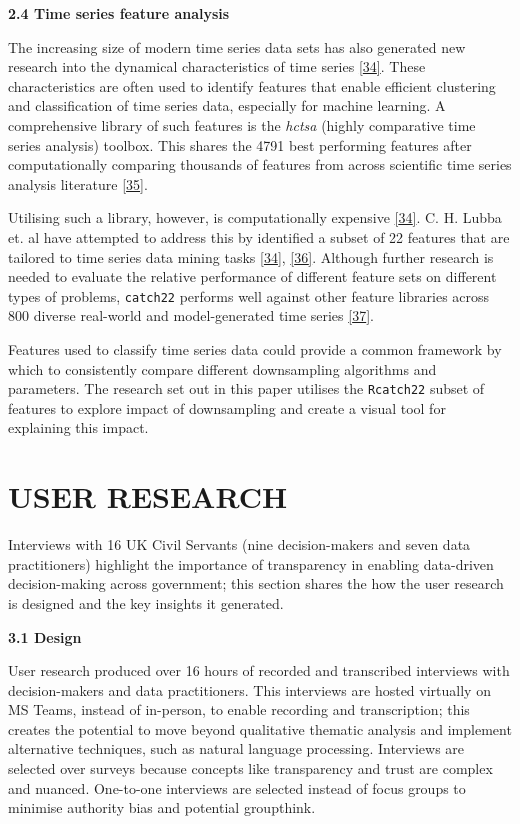\documentclass{article}
\begin{document}
\newpage

\textbf{2.4 Time series feature analysis}

The increasing size of modern time series data sets has also generated
new research into the dynamical characteristics of time series
\protect\hyperlink{ref-catch22}{{[}34{]}}. These characteristics are
often used to identify features that enable efficient clustering and
classification of time series data, especially for machine learning. A
comprehensive library of such features is the \emph{hctsa} (highly
comparative time series analysis) toolbox. This shares the 4791 best
performing features after computationally comparing thousands of
features from across scientific time series analysis literature
\protect\hyperlink{ref-fulcher2017}{{[}35{]}}.

Utilising such a library, however, is computationally expensive
\protect\hyperlink{ref-catch22}{{[}34{]}}. C. H. Lubba et. al have
attempted to address this by identified a subset of 22 features that are
tailored to time series data mining tasks
\protect\hyperlink{ref-catch22}{{[}34{]}},
\protect\hyperlink{ref-bagnall}{{[}36{]}}. Although further research is
needed to evaluate the relative performance of different feature sets on
different types of problems, \texttt{catch22} performs well against
other feature libraries across 800 diverse real-world and
model-generated time series \protect\hyperlink{ref-henderson}{{[}37{]}}.

Features used to classify time series data could provide a common
framework by which to consistently compare different downsampling
algorithms and parameters. The research set out in this paper utilises
the \texttt{Rcatch22} subset of features to explore impact of
downsampling and create a visual tool for explaining this impact.

\hypertarget{user-research}{%
\section{USER RESEARCH}\label{user-research}}

Interviews with 16 UK Civil Servants (nine decision-makers and seven
data practitioners) highlight the importance of transparency in enabling
data-driven decision-making across government; this section shares the
how the user research is designed and the key insights it generated.

\textbf{3.1 Design}

User research produced over 16 hours of recorded and transcribed
interviews with decision-makers and data practitioners. This interviews
are hosted virtually on MS Teams, instead of in-person, to enable
recording and transcription; this creates the potential to move beyond
qualitative thematic analysis and implement alternative techniques, such
as natural language processing. Interviews are selected over surveys
because concepts like transparency and trust are complex and nuanced.
One-to-one interviews are selected instead of focus groups to minimise
authority bias and potential groupthink.
\end{document}
